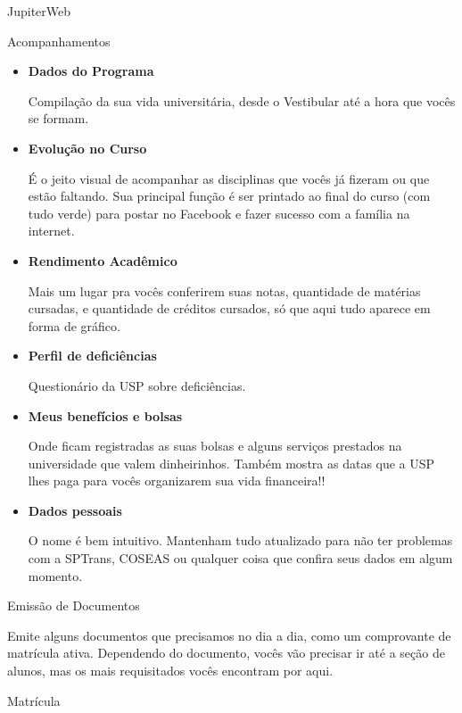 \begin{secao}{JupiterWeb}
\begin{subsecao}{Acompanhamentos}

\begin{itemize}
  \item \textbf{Dados do Programa}

    Compilação da sua vida universitária, desde o Vestibular até a hora que
    vocês se formam.
  \item \textbf{Evolução no Curso}

    É o jeito visual de acompanhar as disciplinas que vocês já fizeram ou que
    estão faltando. Sua principal função é ser printado ao final do curso (com
    tudo verde) para postar no Facebook e fazer sucesso com a família na
    internet.
  \item \textbf{Rendimento Acadêmico}

    Mais um lugar pra vocês conferirem suas notas, quantidade de matérias
    cursadas, e quantidade de créditos cursados, só que aqui tudo aparece em
    forma de gráfico.
  \item \textbf{Perfil de deficiências}

    Questionário da USP sobre deficiências.

  \item \textbf{Meus benefícios e bolsas}

    Onde ficam registradas as suas bolsas e alguns serviços prestados na
    universidade que valem dinheirinhos. Também mostra as datas que a USP lhes
    paga para vocês organizarem sua vida financeira!!

  \item \textbf{Dados pessoais}

    O nome é bem intuitivo. Mantenham tudo atualizado para não ter problemas com
    a SPTrans, COSEAS ou qualquer coisa que confira seus dados em algum momento.

\end{itemize}

\end{subsecao}

\begin{subsecao}{Emissão de Documentos}

Emite alguns documentos que precisamos no dia a dia, como um comprovante de
matrícula ativa. Dependendo do documento, vocês vão precisar ir até a seção de
alunos, mas os mais requisitados vocês encontram por aqui.

\end{subsecao}

\begin{subsecao}{Matrícula}


\end{subsecao}
\end{secao}
